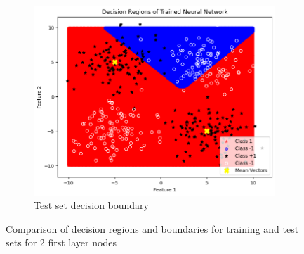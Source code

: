 \documentclass[a4paper,12pt]{article}
\begin{document}
\begin{figure}[H]
    \begin{subfigure}{0.45\textwidth}
        \centering
        \includegraphics[width=\textwidth]{3.2_2_Test.png}
        \caption{Test set decision boundary}
    \end{subfigure}

    \caption{Comparison of decision regions and boundaries for training and test sets for 2 first layer nodes} 
\end{figure}
\end{document}
